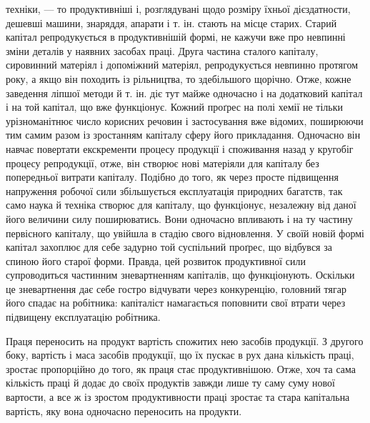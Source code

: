 \parcont{}  %
техніки, — то продуктивніші і, розглядувані щодо розміру
їхньої дієздатности, дешевші машини, знаряддя, апарати і т. ін.
стають на місце старих. Старий капітал репродукується в продуктивнішій
формі, не кажучи вже про невпинні зміни деталів
у наявних засобах праці. Друга частина сталого капіталу, сировинний
матеріял і допоміжний матеріял, репродукується невпинно
протягом року, а якщо він походить із рільництва, то здебільшого
щорічно. Отже, кожне заведення ліпшої методи й т. ін.
діє тут майже одночасно і на додатковий капітал і на той капітал,
що вже функціонує. Кожний проґрес на полі хемії не тільки урізноманітнює
число корисних речовин і застосування вже відомих,
поширюючи тим самим разом із зростанням капіталу сферу його
прикладання. Одночасно він навчає повертати екскременти процесу
продукції і споживання назад у кругобіг процесу репродукції,
отже, він створює нові матеріяли для капіталу без попередньої
витрати капіталу. Подібно до того, як через просте підвищення
напруження робочої сили збільшується експлуатація
природних багатств, так само наука й техніка створює для капіталу,
що функціонує, незалежну від даної його величини силу
поширюватись. Вони одночасно впливають і на ту частину первісного
капіталу, що увійшла в стадію свого відновлення. У своїй
новій формі капітал захоплює для себе задурно той суспільний
проґрес, що відбувся за спиною його старої форми. Правда, цей
розвиток продуктивної сили супроводиться частинним зневартненням
капіталів, що функціонують. Оскільки це зневартнення
дає себе гостро відчувати через конкуренцію, головний тягар
його спадає на робітника: капіталіст намагається поповнити свої
втрати через підвищену експлуатацію робітника.

Праця переносить на продукт вартість спожитих нею засобів
продукції. З другого боку, вартість і маса засобів продукції,
що їх пускає в рух дана кількість праці, зростає пропорційно
до того, як праця стає продуктивнішою. Отже, хоч та сама кількість
праці й додає до своїх продуктів завжди лише ту саму суму
нової вартости, а все ж із зростом продуктивности праці зростає
та стара капітальна вартість, яку вона одночасно переносить
на продукти.

